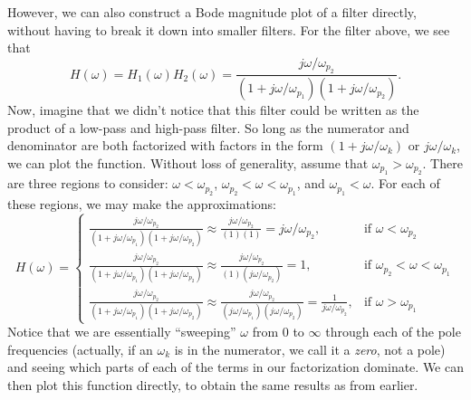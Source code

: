\documentclass[letterpaper]{article}
\theoremstyle{remark}
\begin{document}

However, we can also construct a Bode magnitude plot of a filter directly, without having to break it down into smaller filters. For the filter above, we see that
\[
    H(\omega) = H_1(\omega)H_2(\omega) = \frac{j\omega / \omega_{p_2}}{(1 + j \omega / \omega_{p_1})(1 + j \omega / \omega_{p_2})}.
\]
Now, imagine that we didn't notice that this filter could be written as the product of a low-pass and high-pass filter. So long as the numerator and denominator are both factorized with factors in the form $(1 + j\omega / \omega_k)$ or $j\omega / \omega_k$, we can plot the function. Without loss of generality, assume that $\omega_{p_1} > \omega_{p_2}$. There are three regions to consider: $\omega < \omega_{p_2}$, $\omega_{p_2} < \omega < \omega_{p_1}$, and $\omega_{p_1} < \omega$. For each of these regions, we may make the approximations:
\[
    H(\omega) =
    \begin{cases}
        \frac{j\omega / \omega_{p_2}}{(1 + j \omega / \omega_{p_1})(1 + j \omega / \omega_{p_2})} \approx \frac{j\omega / \omega_{p_2}}{(1)(1)} = j\omega / \omega_{p_2},                              & \text{if } \omega < \omega_{p_2} \\
         \frac{j\omega / \omega_{p_2}}{(1 + j \omega / \omega_{p_1})(1 + j \omega / \omega_{p_2})} \approx \frac{j\omega / \omega_{p_2}}{(1)(j\omega / \omega_{p_2})} = 1,   & \text{if } \omega_{p_2} < \omega < \omega_{p_1} \\
        \frac{j\omega / \omega_{p_2}}{(1 + j \omega / \omega_{p_1})(1 + j \omega / \omega_{p_2})} \approx \frac{j\omega / \omega_{p_2}}{(j\omega / \omega_{p_1})(j\omega / \omega_{p_2})} = \frac{1}{j\omega / \omega_{p_2}},   & \text{if } \omega > \omega_{p_1}
    \end{cases}
\]
Notice that we are essentially ``sweeping'' $\omega$ from $0$ to $\infty$ through each of the pole frequencies (actually, if an $\omega_k$ is in the numerator, we call it a \emph{zero}, not a pole) and seeing which parts of each of the terms in our factorization dominate. We can then plot this function directly, to obtain the same results as from earlier.
\end{document}
